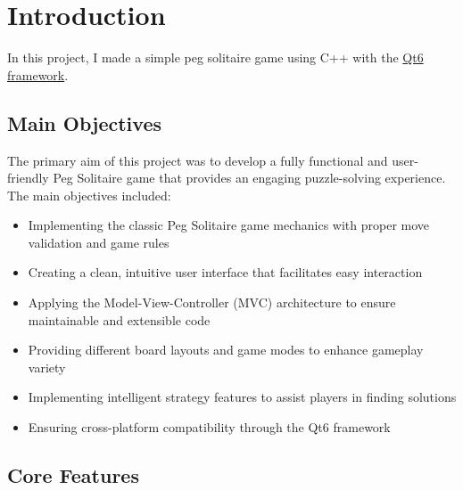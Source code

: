 \section{Introduction}
\label{sec:introduction}

In this project, I made a simple peg solitaire game using C++ with the \href{https://www.qt.io/}{Qt6 framework}.

\subsection{Main Objectives}
The primary aim of this project was to develop a fully functional and user-friendly Peg Solitaire game that provides an engaging puzzle-solving experience. The main objectives included:

\begin{itemize}
    \item Implementing the classic Peg Solitaire game mechanics with proper move validation and game rules
    \item Creating a clean, intuitive user interface that facilitates easy interaction
    \item Applying the Model-View-Controller (MVC) architecture to ensure maintainable and extensible code
    \item Providing different board layouts and game modes to enhance gameplay variety
    \item Implementing intelligent strategy features to assist players in finding solutions
    \item Ensuring cross-platform compatibility through the Qt6 framework
\end{itemize}

\subsection{Core Features}

